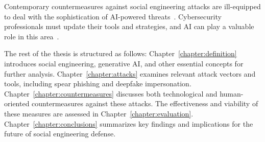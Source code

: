 %
%
Contemporary countermeasures against social engineering attacks are ill-equipped to deal with the sophistication of AI-powered threats~\citep{blauth_AI_Crime_Overview_Malicious_Use_Abuse_2022, king_AI_Crime_Interdisciplinary_Analysis_2019}. Cybersecurity professionals must update their tools and strategies, and AI can play a valuable role in this area~\citep{fakhouri_AI_Driven_Solutions_SE_Attacks_2024, tsinganos_Towards_Automated_Recognition_Chat_SE_Enterprise_2018}.





%
%
The rest of the thesis is structured as follows: Chapter~\ref{chapter:definition} introduces social engineering, generative AI, and other essential concepts for further analysis. Chapter~\ref{chapter:attacks} examines relevant attack vectors and tools, including spear phishing and deepfake impersonation. Chapter~\ref{chapter:countermeasures} discusses both technological and human-oriented countermeasures against these attacks. The effectiveness and viability of these measures are assessed in Chapter~\ref{chapter:evaluation}. Chapter~\ref{chapter:conclusions} summarizes key findings and implications for the future of social engineering defense.






